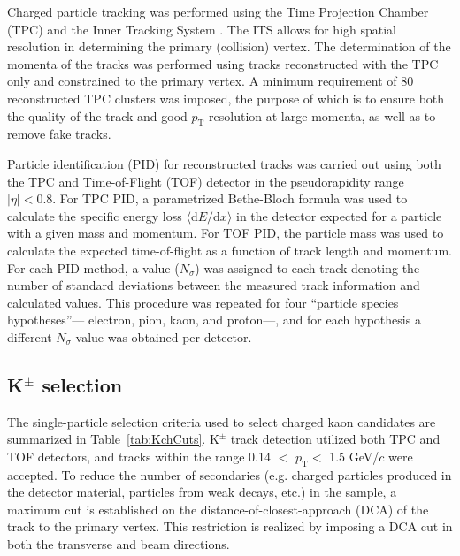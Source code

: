 \documentclass[ALICE,manyauthors]{cernphprep}
\newcommand{\pt}{$p_{\mathrm{T}}$\xspace}
\newcommand{\Kpm}{$\mathrm{K^{\pm}}$\xspace}
\begin{document}
Charged particle tracking was performed using the Time Projection Chamber (TPC) \cite{2010NIMPA.622..316A} and the Inner Tracking System \cite{0954-3899-41-8-087002}.  
The ITS allows for high spatial resolution in determining the primary (collision) vertex.
The determination of the momenta of the tracks was performed using tracks reconstructed with the TPC only and constrained to the primary vertex.
A minimum requirement of 80 reconstructed TPC clusters was imposed, the purpose of which is to ensure both the quality of the track and good \pt resolution at large momenta, as well as to remove fake tracks.

Particle identification (PID) for reconstructed tracks was carried out using both the TPC and Time-of-Flight (TOF) detector \cite{Abelev:2014ffa, Akindinov:2013tea} in the pseudorapidity range $|\eta| < 0.8$.  
For TPC PID, a parametrized Bethe-Bloch formula was used to calculate the specific energy loss $\langle \mathrm{d}E/\mathrm{d}x \rangle$ in the detector expected for a particle with a given mass and momentum.  
For TOF PID, the particle mass was used to calculate the expected time-of-flight as a function of track length and momentum.  
For each PID method, a value ($N_{\sigma}$) was assigned to each track denoting the number of standard deviations between the measured track information and calculated values.  
This procedure was repeated for four ``particle species hypotheses''--- electron, pion, kaon, and proton---, and for each hypothesis a different $N_{\sigma}$ value was obtained per detector.


\subsection{K$^{\pm}$ selection}
\label{sec:KchSelection}
The single-particle selection criteria used to select charged kaon candidates are summarized in Table~\ref{tab:KchCuts}.
\Kpm track detection utilized both TPC and TOF detectors, and tracks within the range 0.14 $<$ \pt $<$ 1.5 GeV/$c$ were accepted.
To reduce the number of secondaries (e.g. charged particles produced in the detector material, particles from weak decays, etc.) in the sample, a maximum cut is established on the distance-of-closest-approach (DCA) of the track to the primary vertex.
This restriction is realized by imposing a DCA cut in both the transverse and beam directions.
\end{document}
